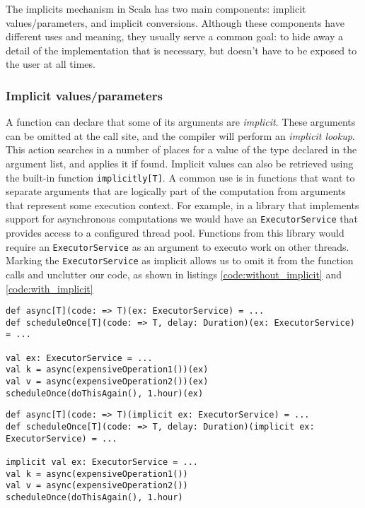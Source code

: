 The implicits mechanism in Scala has two main components: implicit values/parameters, and implicit conversions. Although these components have different uses and meaning, they usually serve a common goal: to hide away a detail of the implementation that is necessary, but doesn't have to be exposed to the user at all times.

\subsubsection{Implicit values/parameters}

A function can declare that some of its arguments are {\it implicit}. These arguments can be omitted at the call site, and the compiler will perform an {\it implicit lookup}. This action searches in a number of places for a value of the type declared in the argument list, and applies it if found. Implicit values can also be retrieved using the built-in function \texttt{implicitly[T]}. A common use is in functions that want to separate arguments that are logically part of the computation from arguments that represent some execution context. For example, in a library that implements support for asynchronous computations we would have an \texttt{ExecutorService} that provides access to a configured thread pool. Functions from this library would require an \texttt{ExecutorService} as an argument to executo work on other threads. Marking the \texttt{ExecutorService} as implicit allows us to omit it from the function calls and unclutter our code, as shown in listings \ref{code:without_implicit} and \ref{code:with_implicit}

\begin{lstlisting}[caption=Code without implicits, label=code:without_implicit]
def async[T](code: => T)(ex: ExecutorService) = ...
def scheduleOnce[T](code: => T, delay: Duration)(ex: ExecutorService) = ...

val ex: ExecutorService = ...
val k = async(expensiveOperation1())(ex)
val v = async(expensiveOperation2())(ex)
scheduleOnce(doThisAgain(), 1.hour)(ex)
\end{lstlisting}

\begin{lstlisting}[caption=Code with implicits, label=code:with_implicit]
def async[T](code: => T)(implicit ex: ExecutorService) = ...
def scheduleOnce[T](code: => T, delay: Duration)(implicit ex: ExecutorService) = ...

implicit val ex: ExecutorService = ...
val k = async(expensiveOperation1())
val v = async(expensiveOperation2())
scheduleOnce(doThisAgain(), 1.hour)
\end{lstlisting}

